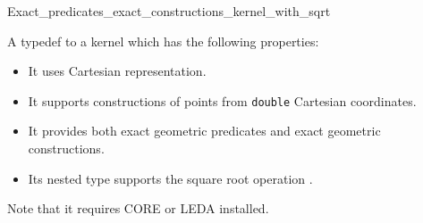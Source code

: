 \begin{ccRefClass}{Exact_predicates_exact_constructions_kernel_with_sqrt}

\ccDefinition
A typedef to a kernel which has the following properties:

\begin{itemize}
\item It uses Cartesian representation.
\item It supports constructions of points from \texttt{double} Cartesian
      coordinates.
\item It provides both exact geometric predicates and exact geometric
      constructions.
\item Its  nested type supports the square root operation .
\end{itemize}

Note that it requires CORE or LEDA installed.


\ccIsModel
{}

\ccSeeAlso
{} \\
 \\

\end{ccRefClass}
